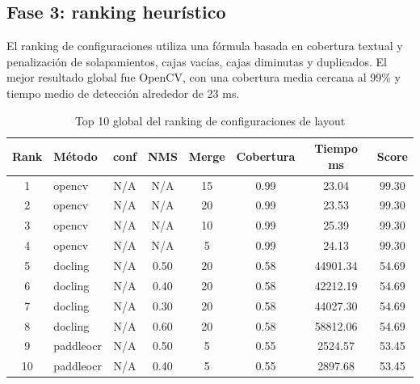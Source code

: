 \documentclass[11pt, a4paper]{article}
\begin{document}
\subsection{Fase 3: ranking heur\'istico}

El ranking de configuraciones utiliza una f\'ormula basada en cobertura textual y penalizaci\'on
de solapamientos, cajas vac\'ias, cajas diminutas y duplicados. El mejor resultado global fue
OpenCV, con una cobertura media cercana al 99\% y tiempo medio de detecci\'on alrededor de 23 ms.

\begin{table}[H]
\centering
\caption{Top 10 global del ranking de configuraciones de layout}
\small
\begin{tabular}{c l c c c c c c}
\toprule
\textbf{Rank} & \textbf{M\'etodo} & \textbf{conf} & \textbf{NMS} & \textbf{Merge} & \textbf{Cobertura} & \textbf{Tiempo ms} & \textbf{Score} \\
\midrule
1 & opencv & N/A & N/A & 15 & 0.99 & 23.04 & 99.30 \\
2 & opencv & N/A & N/A & 20 & 0.99 & 23.53 & 99.30 \\
3 & opencv & N/A & N/A & 10 & 0.99 & 25.39 & 99.30 \\
4 & opencv & N/A & N/A & 5  & 0.99 & 24.13 & 99.30 \\
5 & docling & N/A & 0.50 & 20 & 0.58 & 44901.34 & 54.69 \\
6 & docling & N/A & 0.40 & 20 & 0.58 & 42212.19 & 54.69 \\
7 & docling & N/A & 0.30 & 20 & 0.58 & 44027.30 & 54.69 \\
8 & docling & N/A & 0.60 & 20 & 0.58 & 58812.06 & 54.69 \\
9 & paddleocr & N/A & 0.50 & 5 & 0.55 & 2524.57 & 53.45 \\
10 & paddleocr & N/A & 0.40 & 5 & 0.55 & 2897.68 & 53.45 \\
\bottomrule
\end{tabular}
\normalsize
\end{table}
\end{document}
